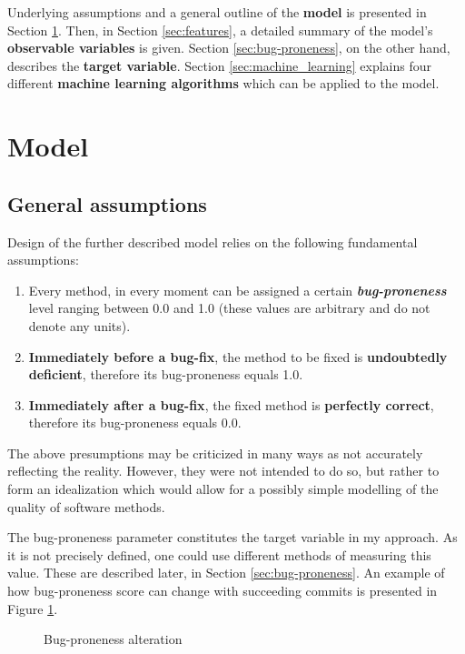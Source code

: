 \documentclass{pracamgr}
\begin{document}
Underlying assumptions and a general outline of the \textbf{model} is presented in Section \ref{sec:model}. Then, in Section \ref{sec:features}, a detailed summary of the model's \textbf{observable variables} is given. Section \ref{sec:bug-proneness}, on the other hand, describes the \textbf{target variable}. Section \ref{sec:machine_learning} explains four different \textbf{machine learning algorithms} which can be applied to the model.

\section{Model}
\label{sec:model}

\subsection{General assumptions}
\label{sec:general_assumptions}
Design of the further described model relies on the following fundamental assumptions:
\begin{enumerate}[label=(A\arabic*)]
	\item Every method, in every moment can be assigned a certain \textbf{\emph{bug-proneness}} level ranging between 0.0 and 1.0 (these values are arbitrary and do not denote any units).
	\item \textbf{Immediately before a bug-fix}, the method to be fixed is \textbf{undoubtedly deficient}, therefore its bug-proneness equals 1.0.
	\item \textbf{Immediately after a bug-fix}, the fixed method is \textbf{perfectly correct}, therefore its bug-proneness equals 0.0. 
\end{enumerate}
The above presumptions may be criticized in many ways as not accurately reflecting the reality. However, they were not intended to do so, but rather to form an idealization which would allow for a possibly simple modelling of the quality of software methods.

The bug-proneness parameter constitutes the target variable in my approach. As it is not precisely defined, one could use different methods of measuring this value. These are described later, in Section \ref{sec:bug-proneness}. An example of how bug-proneness score can change with succeeding commits is presented in Figure \ref{fig:bug_proneness}.

\begin{figure}[h]
\centering

\caption{Bug-proneness alteration}
\label{fig:bug_proneness}
\end{figure}
\end{document}
